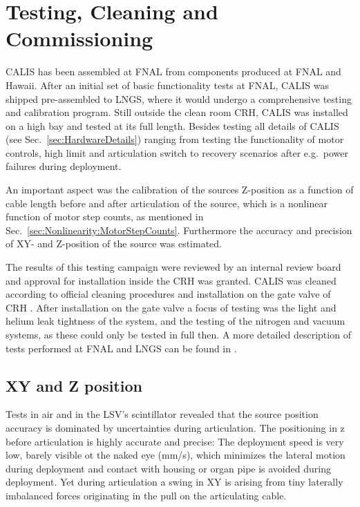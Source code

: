 \section{Testing, Cleaning and Commissioning} \label{sec:Testing}\label{sec:Commissioning}
CALIS has been assembled at FNAL from components produced at FNAL and Hawaii. After an initial set of basic functionality tests at FNAL, CALIS was shipped pre-assembled to LNGS, where it would undergo a comprehensive testing and calibration program. Still outside the clean room CRH, CALIS was installed on a high bay and tested at its full length. Besides testing all details of CALIS (see Sec.~\ref{sec:HardwareDetails}) ranging from testing the functionality of motor controls, high limit and articulation switch to recovery scenarios after e.g.~power failures during deployment.

An important aspect was the calibration of the sources Z-position as a function of cable length before and after articulation of the source, which is a nonlinear function of motor step counts, as mentioned in Sec.~\ref{sec:Nonlinearity:MotorStepCounts}. Furthermore the accuracy and precision of XY- and Z-position of the source was estimated.

The results of this testing campaign were reviewed by an internal review board and approval for installation inside the CRH was granted. CALIS was cleaned according to official cleaning procedures and installation on the gate valve of CRH \cite{DS50:cleaning}. 
After installation on the gate valve a focus of testing was the light and helium leak tightness of the system, and the testing of the nitrogen and vacuum systems, as these could only be tested in full then. A more detailed description of tests performed at FNAL and LNGS can be found in \cite{thesis:Hackett, thesis:Edkins}.

\subsection*{XY and Z position}
Tests in air and in the LSV's scintillator revealed that the source position accuracy is dominated by uncertainties during articulation. The positioning in z before articulation is highly accurate and precise: The deployment speed is very low, barely visible ot the naked eye (mm/s), which minimizes the lateral motion during deployment and contact with housing or organ pipe is avoided during deployment. Yet during articulation a swing in XY is arising from tiny laterally imbalanced forces originating in the pull on the articulating cable. 

